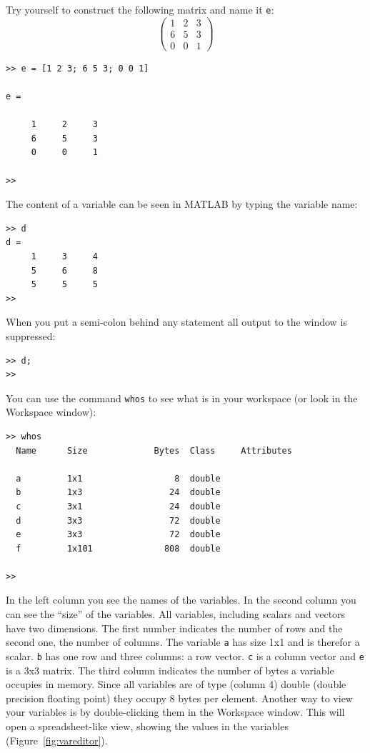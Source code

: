 \documentclass[a4paper]{article}
\begin{document}
\begin{exercise}
  Try yourself to construct the following matrix and name it \lstinline=e=:
    \begin{equation}
    	\begin{pmatrix}
    		1 & 2 & 3 \\
    		6 & 5 & 3 \\
    		0 & 0 & 1 
    	\end{pmatrix}
    \end{equation}
\end{exercise}
\begin{solution}
  \begin{lstlisting}
>> e = [1 2 3; 6 5 3; 0 0 1]

e =

     1     2     3
     6     5     3
     0     0     1

>>
  \end{lstlisting}
\end{solution}

The content of a variable can be seen in MATLAB by typing the variable name:
\begin{lstlisting}
>> d
d =
     1     3     4
     5     6     8
     5     5     5
>>
\end{lstlisting}
When you put a semi-colon behind any statement all output to the window is suppressed:
\begin{lstlisting}
>> d;
>>
\end{lstlisting}

You can use the command \lstinline=whos= to see what is in your workspace (or look in the Workspace window):
\begin{lstlisting}
>> whos
  Name      Size             Bytes  Class     Attributes

  a         1x1                  8  double              
  b         1x3                 24  double              
  c         3x1                 24  double              
  d         3x3                 72  double              
  e         3x3                 72  double              
  f         1x101              808  double              

>>
\end{lstlisting}
In the left column you see the names of the variables. In the second column you can see the ``size'' of the variables. All variables, including scalars and vectors have two dimensions.
The first number indicates the number of rows and the second one, the number of columns. The variable \lstinline=a= has size 1x1 and is therefor a scalar. \lstinline=b= has one row and three columns: a row vector. \lstinline=c= is a column vector and \lstinline=e= is a 3x3 matrix. The third column indicates the number of bytes a variable occupies in memory. Since all variables are of type (column 4) double (double precision floating point) they occupy 8 bytes per element. 
Another way to view your variables is by double-clicking them in the Workspace window. This will open a spreadsheet-like view, showing the values in the variables (Figure~\ref{fig:vareditor}).
\end{document}
